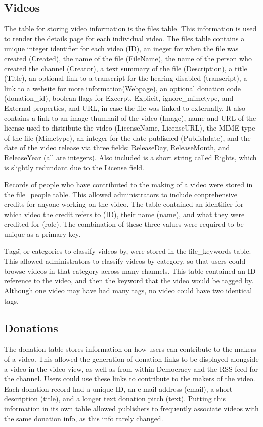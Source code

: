 \documentclass[a4paper,12pt]{report}
\begin{document}
\subsection{Videos}
The table for storing video information is the files table. This information is used to render the details page for each individual video. The files table contains a unique integer identifier for each video (ID), an ineger for when the file was created (Created), the name of the file (FileName), the name of the person who created the channel (Creator), a text summary of the file (Description), a title (Title), an optional link to a transcript for the hearing-disabled (transcript), a link to a website for more information(Webpage), an optional donation code (donation\_id), boolean flags for Excerpt, Explicit, ignore\_mimetype, and External properties, and URL, in case the file was linked to externally. It also contains a link to an image thumnail of the video (Image), name and URL of the license used to distribute the video (LicenseName, LicenseURL), the MIME-type of the file (Mimetype), an integer for the date published (Publishdate), and the date of the video release via three fields: ReleaseDay, ReleaseMonth, and ReleaseYear (all are integers). Also included is a short string called Rights, which is slightly redundant due to the License field. 


Records of people who have contributed to the making of a video were stored in the file\_people table. This allowed administrators to include conprehensive credits for anyone working on the video. The table contained an identifier for which video the credit refers to (ID), their name (name), and what they were credited for (role). The combination of these three values were required to be unique as a primary key.


\"Tags\", or categories to classify videos by, were stored in the file\_keywords table. This allowed administrators to classify videos by category, so that users could browse videos in that category across many channels. This table contained an ID reference to the video, and then the keyword that the video would be tagged by. Although one video may have had many tags, no video could have two identical tags.


\subsection{Donations}
The donation table stores information on how users can contribute to the makers of a video. This allowed the generation of donation links to be displayed alongside a video in the video view, as well as from within Democracy and the RSS feed for the channel. Users could use these links to contribute to the makers of the video. Each donation record had a unique ID, an e-mail address (email), a short description (title), and a longer text donation pitch (text). Putting this information in its own table allowed publishers to frequently associate videos with the same donation info, as this info rarely changed. 
\end{document}
